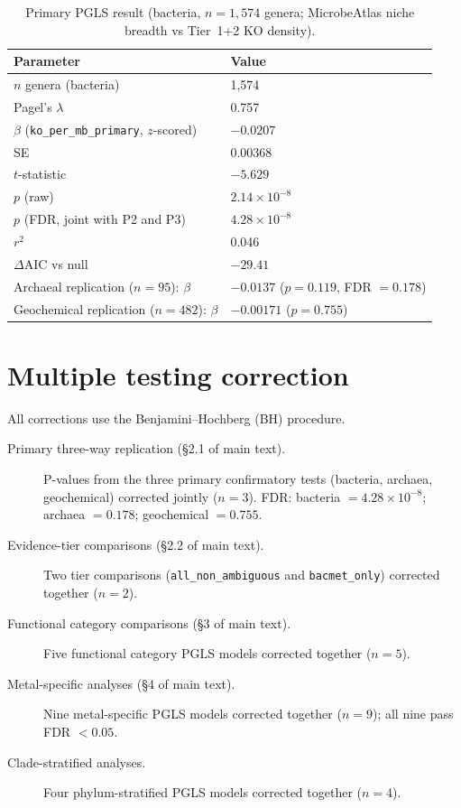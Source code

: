 \documentclass[11pt]{article}
\begin{document}
\begin{table}[H]
\centering
\caption{Primary PGLS result (bacteria, $n = 1{,}574$ genera; MicrobeAtlas
niche breadth vs Tier~1+2 KO density).}
\label{tab:p1}
\small
\begin{tabular}{ll}
\toprule
Parameter & Value \\
\midrule
$n$ genera (bacteria) & 1,574 \\
Pagel's $\lambda$ & 0.757 \\
$\beta$ (\texttt{ko\_per\_mb\_primary}, $z$-scored) & $-0.0207$ \\
SE & $0.00368$ \\
$t$-statistic & $-5.629$ \\
$p$ (raw) & $2.14 \times 10^{-8}$ \\
$p$ (FDR, joint with P2 and P3) & $4.28 \times 10^{-8}$ \\
$r^2$ & 0.046 \\
$\Delta$AIC vs null & $-29.41$ \\
\midrule
Archaeal replication ($n = 95$): $\beta$ & $-0.0137$ ($p = 0.119$, FDR $= 0.178$) \\
Geochemical replication ($n = 482$): $\beta$ & $-0.00171$ ($p = 0.755$) \\
\bottomrule
\end{tabular}
\end{table}

\section{Multiple testing correction}
\label{sm:mtc}

All corrections use the Benjamini--Hochberg (BH) procedure.

\begin{description}
\item[Primary three-way replication (§2.1 of main text).]
  P-values from the three primary confirmatory tests (bacteria, archaea,
  geochemical) corrected jointly ($n = 3$).
  FDR: bacteria $= 4.28 \times 10^{-8}$; archaea $= 0.178$;
  geochemical $= 0.755$.

\item[Evidence-tier comparisons (§2.2 of main text).]
  Two tier comparisons (\texttt{all\_non\_ambiguous} and \texttt{bacmet\_only})
  corrected together ($n = 2$).

\item[Functional category comparisons (§3 of main text).]
  Five functional category PGLS models corrected together ($n = 5$).

\item[Metal-specific analyses (§4 of main text).]
  Nine metal-specific PGLS models corrected together ($n = 9$);
  all nine pass FDR $< 0.05$.

\item[Clade-stratified analyses.]
  Four phylum-stratified PGLS models corrected together ($n = 4$).
\end{description}
\end{document}
